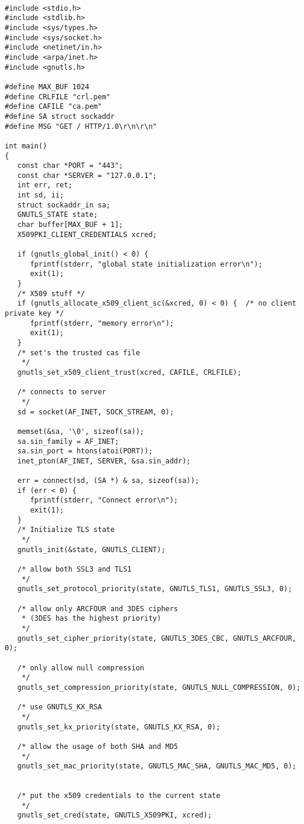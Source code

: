\begin{verbatim}

#include <stdio.h>
#include <stdlib.h>
#include <sys/types.h>
#include <sys/socket.h>
#include <netinet/in.h>
#include <arpa/inet.h>
#include <gnutls.h>

#define MAX_BUF 1024
#define CRLFILE "crl.pem"
#define CAFILE "ca.pem"
#define SA struct sockaddr
#define MSG "GET / HTTP/1.0\r\n\r\n"

int main()
{
   const char *PORT = "443";
   const char *SERVER = "127.0.0.1";
   int err, ret;
   int sd, ii;
   struct sockaddr_in sa;
   GNUTLS_STATE state;
   char buffer[MAX_BUF + 1];
   X509PKI_CLIENT_CREDENTIALS xcred;

   if (gnutls_global_init() < 0) {
      fprintf(stderr, "global state initialization error\n");
      exit(1);
   }
   /* X509 stuff */
   if (gnutls_allocate_x509_client_sc(&xcred, 0) < 0) {  /* no client private key */
      fprintf(stderr, "memory error\n");
      exit(1);
   }
   /* set's the trusted cas file
    */
   gnutls_set_x509_client_trust(xcred, CAFILE, CRLFILE);

   /* connects to server 
    */
   sd = socket(AF_INET, SOCK_STREAM, 0);

   memset(&sa, '\0', sizeof(sa));
   sa.sin_family = AF_INET;
   sa.sin_port = htons(atoi(PORT));
   inet_pton(AF_INET, SERVER, &sa.sin_addr);

   err = connect(sd, (SA *) & sa, sizeof(sa));
   if (err < 0) {
      fprintf(stderr, "Connect error\n");
      exit(1);
   }
   /* Initialize TLS state 
    */
   gnutls_init(&state, GNUTLS_CLIENT);

   /* allow both SSL3 and TLS1
    */
   gnutls_set_protocol_priority(state, GNUTLS_TLS1, GNUTLS_SSL3, 0);

   /* allow only ARCFOUR and 3DES ciphers
    * (3DES has the highest priority)
    */
   gnutls_set_cipher_priority(state, GNUTLS_3DES_CBC, GNUTLS_ARCFOUR, 0);

   /* only allow null compression
    */
   gnutls_set_compression_priority(state, GNUTLS_NULL_COMPRESSION, 0);

   /* use GNUTLS_KX_RSA
    */
   gnutls_set_kx_priority(state, GNUTLS_KX_RSA, 0);

   /* allow the usage of both SHA and MD5
    */
   gnutls_set_mac_priority(state, GNUTLS_MAC_SHA, GNUTLS_MAC_MD5, 0);


   /* put the x509 credentials to the current state
    */
   gnutls_set_cred(state, GNUTLS_X509PKI, xcred);



\end{verbatim}
